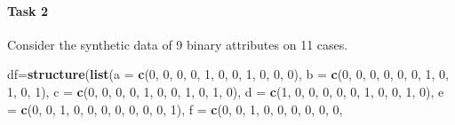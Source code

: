 \documentclass[]{book}
\newenvironment{Shaded}{\begin{snugshade}}{\end{snugshade}}
\newcommand{\DataTypeTok}[1]{\textcolor[rgb]{0.13,0.29,0.53}{#1}}
\newcommand{\DecValTok}[1]{\textcolor[rgb]{0.00,0.00,0.81}{#1}}
\newcommand{\KeywordTok}[1]{\textcolor[rgb]{0.13,0.29,0.53}{\textbf{#1}}}
\newcommand{\NormalTok}[1]{#1}
\let\oldparagraph\paragraph
\renewcommand{\paragraph}[1]{\oldparagraph{#1}\mbox{}}
\theoremstyle{definition}
\theoremstyle{definition}
\theoremstyle{definition}
\theoremstyle{remark}
\begin{document}
\hypertarget{task-2-1}{%
\paragraph{Task 2}\label{task-2-1}}

Consider the synthetic data of 9 binary attributes on 11 cases.

\begin{Shaded}
\begin{Highlighting}[]
\NormalTok{df=}\KeywordTok{structure}\NormalTok{(}\KeywordTok{list}\NormalTok{(}\DataTypeTok{a =} \KeywordTok{c}\NormalTok{(}\DecValTok{0}\NormalTok{, }\DecValTok{0}\NormalTok{, }\DecValTok{0}\NormalTok{, }\DecValTok{0}\NormalTok{, }\DecValTok{1}\NormalTok{, }\DecValTok{0}\NormalTok{, }\DecValTok{0}\NormalTok{, }\DecValTok{1}\NormalTok{, }\DecValTok{0}\NormalTok{, }\DecValTok{0}\NormalTok{, }\DecValTok{0}\NormalTok{), }\DataTypeTok{b =} \KeywordTok{c}\NormalTok{(}\DecValTok{0}\NormalTok{, }
\DecValTok{0}\NormalTok{, }\DecValTok{0}\NormalTok{, }\DecValTok{0}\NormalTok{, }\DecValTok{0}\NormalTok{, }\DecValTok{0}\NormalTok{, }\DecValTok{1}\NormalTok{, }\DecValTok{0}\NormalTok{, }\DecValTok{1}\NormalTok{, }\DecValTok{0}\NormalTok{, }\DecValTok{1}\NormalTok{), }\DataTypeTok{c =} \KeywordTok{c}\NormalTok{(}\DecValTok{0}\NormalTok{, }\DecValTok{0}\NormalTok{, }\DecValTok{0}\NormalTok{, }\DecValTok{0}\NormalTok{, }\DecValTok{1}\NormalTok{, }\DecValTok{0}\NormalTok{, }\DecValTok{0}\NormalTok{, }\DecValTok{1}\NormalTok{, }
\DecValTok{0}\NormalTok{, }\DecValTok{1}\NormalTok{, }\DecValTok{0}\NormalTok{), }\DataTypeTok{d =} \KeywordTok{c}\NormalTok{(}\DecValTok{1}\NormalTok{, }\DecValTok{0}\NormalTok{, }\DecValTok{0}\NormalTok{, }\DecValTok{0}\NormalTok{, }\DecValTok{0}\NormalTok{, }\DecValTok{0}\NormalTok{, }\DecValTok{1}\NormalTok{, }\DecValTok{0}\NormalTok{, }\DecValTok{0}\NormalTok{, }\DecValTok{1}\NormalTok{, }\DecValTok{0}\NormalTok{), }\DataTypeTok{e =} \KeywordTok{c}\NormalTok{(}\DecValTok{0}\NormalTok{, }\DecValTok{0}\NormalTok{, }
\DecValTok{1}\NormalTok{, }\DecValTok{0}\NormalTok{, }\DecValTok{0}\NormalTok{, }\DecValTok{0}\NormalTok{, }\DecValTok{0}\NormalTok{, }\DecValTok{0}\NormalTok{, }\DecValTok{0}\NormalTok{, }\DecValTok{0}\NormalTok{, }\DecValTok{1}\NormalTok{), }\DataTypeTok{f =} \KeywordTok{c}\NormalTok{(}\DecValTok{0}\NormalTok{, }\DecValTok{0}\NormalTok{, }\DecValTok{1}\NormalTok{, }\DecValTok{0}\NormalTok{, }\DecValTok{0}\NormalTok{, }\DecValTok{0}\NormalTok{, }\DecValTok{0}\NormalTok{, }\DecValTok{0}\NormalTok{, }\DecValTok{0}\NormalTok{, }

\end{Highlighting}
\end{Shaded}
\end{document}
